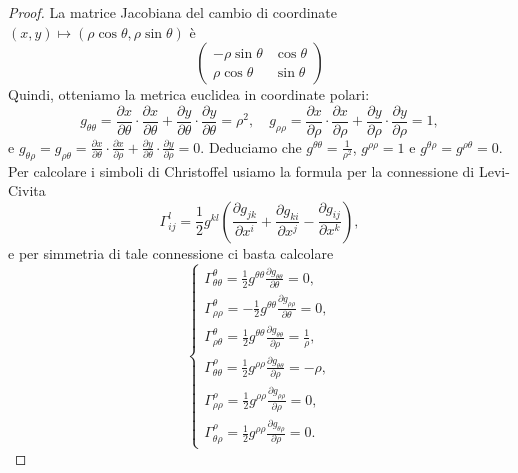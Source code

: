 \documentclass[a4paper]{article}
\theoremstyle{definition}
\theoremstyle{definition}
\theoremstyle{remark}
\theoremstyle{definition}
\begin{document}
\begin{proof}
	La matrice Jacobiana del cambio di coordinate $(x, y) \mapsto (\rho \cos \theta, \rho \sin \theta)$ è
	\[
		\begin{pmatrix}
			-\rho \sin \theta & \cos \theta \\
			\rho \cos \theta  & \sin \theta
		\end{pmatrix}
	\]
	Quindi, otteniamo la metrica euclidea in coordinate polari:
	\[
		g_{\theta \theta} = \frac{\partial x}{\partial \theta}\cdot \frac{\partial x}{\partial \theta} + \frac{\partial y}{\partial \theta}\cdot \frac{\partial y}{\partial \theta} = \rho^2, \quad g_{\rho \rho} = \frac{\partial x}{\partial \rho}\cdot \frac{\partial x}{\partial \rho} + \frac{\partial y}{\partial \rho}\cdot \frac{\partial y}{\partial \rho} = 1,
	\]
	e $g_{\theta \rho} = g_{\rho \theta} = \frac{\partial x}{\partial \theta}\cdot \frac{\partial x}{\partial \rho} + \frac{\partial y}{\partial \theta}\cdot \frac{\partial y}{\partial \rho} = 0$.
	Deduciamo che $g^{\theta \theta} = \frac{1}{\rho^2}$, $g^{\rho \rho} = 1$ e $g^{\theta \rho} = g^{\rho \theta} = 0$.
	Per calcolare i simboli di Christoffel usiamo la formula per la connessione di Levi-Civita
	\[
		\Gamma^l_{ij} = \frac{1}{2} g^{kl} \left( \frac{\partial g_{jk}}{\partial x^i} + \frac{\partial g_{ki}}{\partial x^j} - \frac{\partial g_{ij}}{\partial x^k} \right),
	\]
	e per simmetria di tale connessione ci basta calcolare
	\[
		\begin{cases}

			\Gamma^{\theta}_{\theta \theta} = \frac{1}{2} g^{\theta \theta} \frac{\partial g_{\theta \theta}}{\partial \theta} = 0,          \\
			\Gamma^{\theta}_{\rho \rho} = -\frac{1}{2} g^{\theta \theta} \frac{\partial g_{\rho \rho}}{\partial \theta} = 0,                 \\
			\Gamma^{\theta}_{\rho \theta} = \frac{1}{2} g^{\theta \theta} \frac{\partial g_{\theta \theta}}{\partial \rho} = \frac{1}{\rho}, \\
			\Gamma^{\rho}_{\theta \theta} = \frac{1}{2} g^{\rho \rho} \frac{\partial g_{\theta \theta}}{\partial \rho} = -\rho,              \\
			\Gamma^{\rho}_{\rho \rho} = \frac{1}{2} g^{\rho \rho} \frac{\partial g_{\rho \rho}}{\partial \rho} = 0,                          \\
			\Gamma^{\rho}_{\theta \rho} = \frac{1}{2} g^{\rho \rho} \frac{\partial g_{\theta \rho}}{\partial \rho} = 0.
		\end{cases}
	\]
\end{proof}
\end{document}
